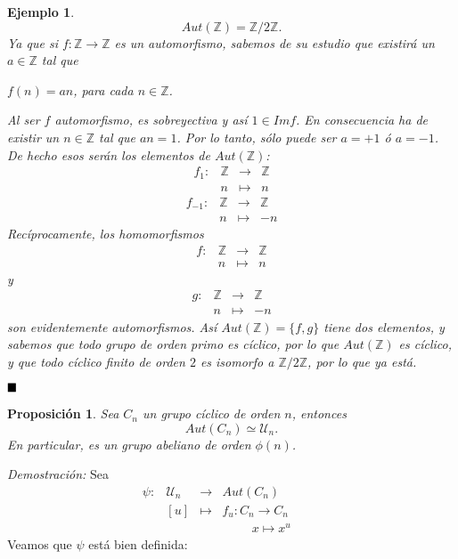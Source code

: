 \documentclass[12pt]{article}
\newtheorem{proposition}[theorem]{Proposición}
\newtheorem{example}{Ejemplo}[theorem]
\begin{document}
\begin{example}$$Aut(\mathbb{Z}) = \mathbb{Z}/2\mathbb{Z}.$$
Ya que si $f\colon \mathbb{Z} \longrightarrow \mathbb{Z}$ es un automorfismo, sabemos de su estudio que existirá un $a \in \mathbb{Z}$ tal que
\begin{center}
$f(n) = an$, para cada $n \in \mathbb{Z}$.
\end{center}
Al ser $f$ automorfismo, es sobreyectiva y así $1 \in Im f$. En consecuencia ha de existir un $n \in \mathbb{Z}$ tal que $an = 1$. Por lo tanto, sólo puede ser $a = +1$ ó $a = -1$. De hecho esos serán los elementos de $Aut(\mathbb{Z})$: 
$$\begin{array}{rccl}
f_{1}\colon &\mathbb{Z}& \longrightarrow &\mathbb{Z}\\
&n& \longmapsto &n
\end{array}
$$ 
$$\begin{array}{rccl}
f_{-1}\colon &\mathbb{Z}& \longrightarrow &\mathbb{Z}\\
&n& \longmapsto &-n
\end{array}
$$  Recíprocamente, los homomorfismos 
$$\begin{array}{rccl}
f\colon &\mathbb{Z}& \longrightarrow &\mathbb{Z}\\
&n& \longmapsto &n
\end{array}
$$  y $$\begin{array}{rccl}
g\colon &\mathbb{Z}& \longrightarrow &\mathbb{Z}\\
&n& \longmapsto &-n
\end{array}
$$  son evidentemente automorfismos. Así $Aut(\mathbb{Z}) = \lbrace f, g \rbrace$ tiene dos elementos, y sabemos que todo grupo de orden primo es cíclico, por lo que $Aut(\mathbb{Z})$ es cíclico, y que todo cíclico finito de orden $2$ es isomorfo a $\mathbb{Z}/2\mathbb{Z}$, por lo que ya está.
\end{example}

$\hfill \blacksquare$

\begin{proposition}Sea $C_{n}$ un grupo cíclico de orden $n$, entonces $$Aut(C_{n}) \simeq \mathcal{U}_{n}.$$ 
En particular, es un grupo abeliano de orden $\phi(n)$.
\end{proposition}
\emph{Demostración: }Sea $$\begin{array}{rccllll}
\psi \colon &\mathcal{U}_{n}& \longrightarrow &Aut(C_{n})& & & \\
&[u]& \longmapsto &f_{u} \colon C_{n} \longrightarrow C_{n}& & & \\
& &  & \hspace{1cm} x \longmapsto x^{u}& & & 
\end{array}
$$
Veamos que $\psi$ está bien definida:
\end{document}
